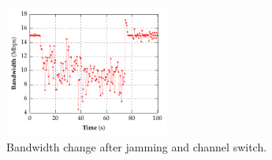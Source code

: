 \begin{figure}[t!]
  \centering
  \includegraphics[width=0.48\textwidth]{./figures/ChannelBWGraph.pdf}
  \caption{Bandwidth change after jamming and channel switch.}
  \label{fig:bw}
\end{figure}
